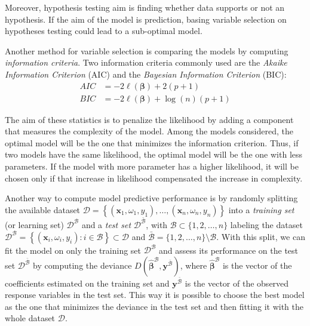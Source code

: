 \documentclass[a4paper, twoside, openright, 12pt]{report}
\theoremstyle{definition}
\theoremstyle{definition}
\theoremstyle{definition}
\theoremstyle{remark}
\begin{document}
Moreover, hypothesis testing aim is finding whether data supports or not an hypothesis. If the aim of the model is prediction, basing variable selection on hypotheses testing could lead to a sub-optimal model.

Another method for variable selection is comparing the models by computing \emph{information criteria}. Two information criteria commonly used are the \emph{Akaike Information Criterion} (AIC) and the \emph{Bayesian Information Criterion} (BIC):
\begin{align*}
AIC & = -2\ell(\boldsymbol{\beta}) + 2 (p+1) \\
BIC & = -2\ell(\boldsymbol{\beta}) + \log(n) (p+1)
\end{align*}

The aim of these statistics is to penalize the likelihood by adding a component that measures the complexity of the model. Among the models considered, the optimal model will be the one that minimizes the information criterion. Thus, if two models have the same likelihood, the optimal model will be the one with less parameters. If the model with more parameter has a higher likelihood, it will be chosen only if that increase in likelihood compensated the increase in complexity.

Another way to compute model predictive performance is by randomly splitting the available dataset \(\mathcal{D} = \left\{ (\boldsymbol{x}_1, \omega_1, y_1), \dots, (\boldsymbol{x}_n, \omega_n, y_n) \right\}\) into a \emph{training set} (or learning set) \(\mathcal{D}^{\mathcal{B}}\) and a \emph{test set} \(\mathcal{D}^{\bar{\mathcal{B}}}\), with \(\mathcal{B}\subset\{1,2,\dots,n\}\) labeling the dataset \(\mathcal{D}^{\mathcal{B}} = \left\{ (\boldsymbol{x}_i, \omega_i, y_i): i \in \mathcal{B} \right\} \subset \mathcal{D}\) and \(\bar{\mathcal{B}} = \{1, 2, \dots, n\} \setminus \mathcal{B}\). With this split, we can fit the model on only the training set \(\mathcal{D}^{\mathcal{B}}\) and assess its performance on the test set \(\mathcal{D}^{\bar{\mathcal{B}}}\) by computing the deviance \(D\left( \hat{\boldsymbol{\beta}}^{\mathcal{B}}, \boldsymbol{y}^{\bar{\mathcal{B}}} \right)\), where \(\hat{\boldsymbol{\beta}}^{\mathcal{B}}\) is the vector of the coefficients estimated on the training set and \(\boldsymbol{y}^{\bar{\mathcal{B}}}\) is the vector of the observed response variables in the test set. This way it is possible to choose the best model as the one that minimizes the deviance in the test set and then fitting it with the whole dataset \(\mathcal{D}\).
\end{document}
